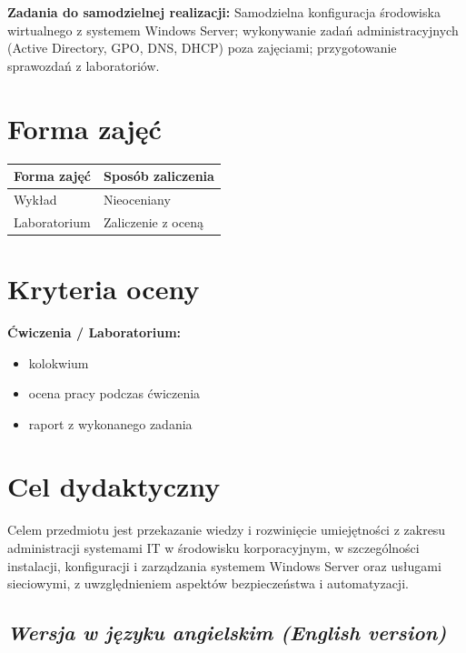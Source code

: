 \documentclass[12pt, a4paper]{article}
\newcommand{\thdrule}{\noalign{\global\setlength{\extrarowheight}{0pt}}}
\newcommand{\thdend}{\noalign{\global\setlength{\extrarowheight}{3pt}}}
\begin{document}
\vspace{4pt}
\noindent\textbf{Zadania do samodzielnej realizacji:} Samodzielna konfiguracja środowiska wirtualnego z systemem Windows Server; wykonywanie zadań administracyjnych (Active Directory, GPO, DNS, DHCP) poza zajęciami; przygotowanie sprawozdań z laboratoriów.

\section{Forma zajęć}

\begin{center}
{\scriptsize
\begin{tabular}{m{5cm}m{8cm}}
\thdrule\toprule
\rowcolor{pjatkRed} {\color{white}\textbf{Forma zajęć}} & {\color{white}\textbf{Sposób zaliczenia}} \\
\midrule\thdend
  \rowcolor{tableRowLight} Wykład & Nieoceniany \\
  \rowcolor{tableRowAlt} Laboratorium & Zaliczenie z oceną \\
\bottomrule
\end{tabular}}
\end{center}

\section{Kryteria oceny}

\textbf{Ćwiczenia / Laboratorium:}
\begin{itemize}
  \item kolokwium
  \item ocena pracy podczas ćwiczenia
  \item raport z wykonanego zadania
\end{itemize}


\section{Cel dydaktyczny}

Celem przedmiotu jest przekazanie wiedzy i rozwinięcie umiejętności z zakresu administracji systemami IT w środowisku korporacyjnym, w szczególności instalacji, konfiguracji i zarządzania systemem Windows Server oraz usługami sieciowymi, z uwzględnieniem aspektów bezpieczeństwa i automatyzacji.

\subsection*{\textit{Wersja w języku angielskim (English version)}}
\end{document}
